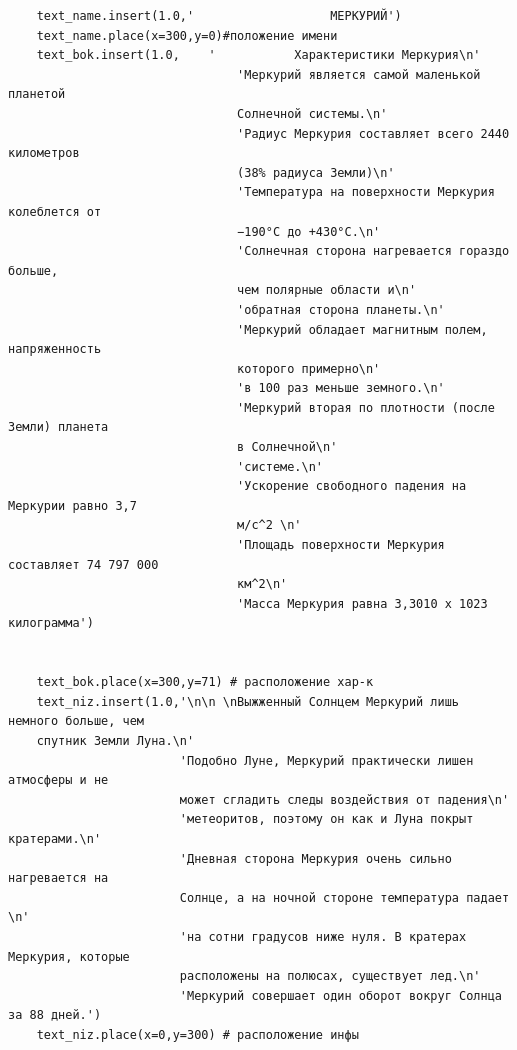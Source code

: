 \documentclass[11pt,a4paper]{report}
\begin{document}
\begin{verbatim}
    text_name.insert(1.0,'                   МЕРКУРИЙ')
    text_name.place(x=300,y=0)#положение имени
    text_bok.insert(1.0,    '           Характеристики Меркурия\n' 
                                'Меркурий является самой маленькой планетой 
                                Солнечной системы.\n'
                                'Радиус Меркурия составляет всего 2440 километров 
                                (38% радиуса Земли)\n'
                                'Температура на поверхности Меркурия колеблется от 
                                −190°C до +430°C.\n'
                                'Солнечная сторона нагревается гораздо больше, 
                                чем полярные области и\n'
                                'обратная сторона планеты.\n'
                                'Меркурий обладает магнитным полем, напряженность 
                                которого примерно\n' 
                                'в 100 раз меньше земного.\n'
                                'Меркурий вторая по плотности (после Земли) планета 
                                в Солнечной\n'
                                'системе.\n'
                                'Ускорение свободного падения на Меркурии равно 3,7 
                                м/c^2 \n'
                                'Площадь поверхности Меркурия составляет 74 797 000 
                                км^2\n' 
                                'Масса Меркурия равна 3,3010 х 1023 килограмма')
        
        
    text_bok.place(x=300,y=71) # расположение хар-к        
    text_niz.insert(1.0,'\n\n \nВыжженный Солнцем Меркурий лишь немного больше, чем 
    спутник Земли Луна.\n'
                        'Подобно Луне, Меркурий практически лишен атмосферы и не 
                        может сгладить следы воздействия от падения\n' 
                        'метеоритов, поэтому он как и Луна покрыт кратерами.\n'
                        'Дневная сторона Меркурия очень сильно нагревается на 
                        Солнце, а на ночной стороне температура падает \n'
                        'на сотни градусов ниже нуля. В кратерах Меркурия, которые 
                        расположены на полюсах, существует лед.\n'
                        'Меркурий совершает один оборот вокруг Солнца за 88 дней.')
    text_niz.place(x=0,y=300) # расположение инфы  
\end{verbatim}
 
\end{document}
